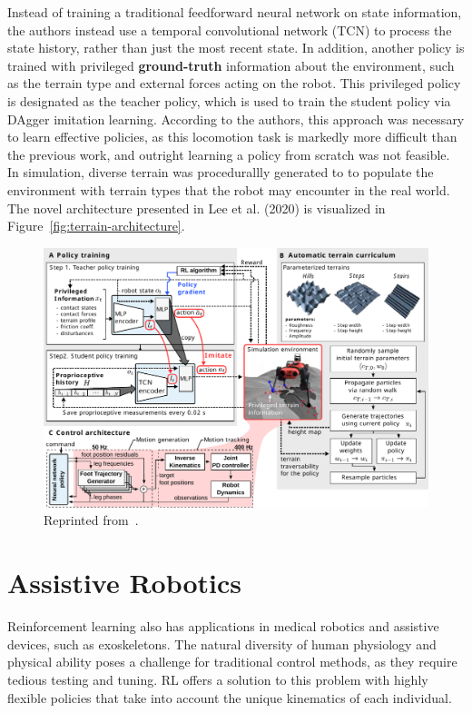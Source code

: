 \documentclass[12pt]{report}
\theoremstyle{definition}
\theoremstyle{remark}
\begin{document}
Instead of training a traditional feedforward neural network on state information, the authors instead use a temporal convolutional network (TCN) to process the state history, rather than just the most recent state. In addition, another policy is trained with privileged \textbf{ground-truth} information about the environment, such as the terrain type and external forces acting on the robot. This privileged policy is designated as the teacher policy, which is used to train the student policy via DAgger imitation learning. According to the authors, this approach was necessary to learn effective policies, as this locomotion task is markedly more difficult than the previous work, and outright learning a policy from scratch was not feasible. In simulation, diverse terrain was procedurallly generated to to populate the environment with terrain types that the robot may encounter in the real world. The novel architecture presented in Lee et al. (2020) is visualized in Figure~\ref{fig:terrain-architecture}.
\begin{figure}[H]
    \centering
    \includegraphics[width=\linewidth]{figs/figure4.pdf}
    \caption{Reprinted from~\cite{lee_learning_2020}.}
    \label{fig:anymal-terrain-architecture}
\end{figure}

\cite{hutter_legged_2022}

\section{Assistive Robotics}

Reinforcement learning also has applications in medical robotics and assistive devices, such as exoskeletons. The natural diversity of human physiology and physical ability poses a challenge for traditional control methods, as they require tedious testing and tuning. RL offers a solution to this problem with highly flexible policies that take into account the unique kinematics of each individual.
\end{document}
